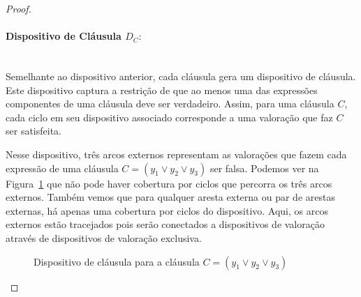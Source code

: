 \documentclass[paper=a4, fontsize=11pt]{scrartcl} %
\numberwithin{equation}{subsection}
\numberwithin{figure}{subsection}
\numberwithin{table}{subsection}
\numberwithin{definition}{subsection}
\numberwithin{theorem}{subsection}
\numberwithin{property}{subsection}
\numberwithin{proposition}{subsection}
\begin{document}
\begin{proof}
\paragraph{Dispositivo de Cláusula $D_C:$} \hfill \\

Semelhante ao dispositivo anterior, cada cláusula gera um dispositivo de cláusula. Este dispositivo captura a restrição de que ao menos uma das expressões componentes de uma cláusula deve ser verdadeiro. Assim, para uma cláusula $C$, cada ciclo em seu dispositivo associado corresponde a uma valoração que faz $C$ ser satisfeita.

Nesse dispositivo, três arcos externos representam as valorações que fazem cada expressão de uma cláusula $C = (y_1 \lor y_2 \lor y_3)$ ser falsa. Podemos ver na Figura~\ref{fig:Dc} que não pode haver cobertura por ciclos que percorra os três arcos externos. Também vemos que para qualquer aresta externa ou par de arestas externas, há apenas uma cobertura por ciclos do dispositivo. Aqui, os arcos externos estão tracejados pois serão conectados a dispositivos de valoração através de dispositivos de valoração exclusiva.

\begin{figure}
\centering
{}
\caption{Dispositivo de cláusula para a cláusula $C = (y_1 \lor y_2 \lor y_3)$}
\label{fig:Dc}
\end{figure}
\FloatBarrier


\end{proof}
\end{document}
